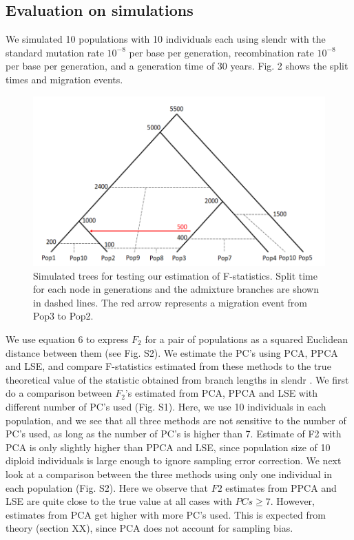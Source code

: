 \documentclass[12pt, letterpaper]{article}
\begin{document}
\subsection{Evaluation on simulations}
We simulated 10 populations with 10 individuals each using slendr \cite{petr_slendr_2022} with the standard mutation rate $10^{-8}$ per base per generation, recombination rate $10^{-8}$ per base per generation, and a generation time of 30 years. Fig. 2 shows the split times and migration events. 

\begin{figure}[ht!]
    \includegraphics[width=16.5cm]{inkscape/sim1.png}
    \centering
    \caption{Simulated trees for testing our estimation of F-statistics. Split time for each node in generations and the admixture branches are shown in dashed lines. The red arrow represents a migration event from Pop3 to Pop2.}
    \label{fig2:sim}
\end{figure}

We use equation 6 to express $F_2$ for a pair of populations as a squared Euclidean distance between them (see Fig. S2). We estimate the PC's using PCA, PPCA and LSE, and compare F-statistics estimated from these methods to the true theoretical value of the statistic obtained from branch lengths in slendr \cite{petr_slendr_2022}. We first do a comparison between $F_2$'s estimated from PCA, PPCA and LSE with different number of PC's used (Fig. S1). Here, we use 10 individuals in each population, and we see that all three methods are not sensitive to the number of PC's used, as long as the number of PC's is higher than 7. Estimate of F2 with PCA is only slightly higher than PPCA and LSE, since population size of 10 diploid individuals is large enough to ignore sampling error correction. We next look at a comparison between the three methods using only one individual in each population (Fig. S2). Here we observe that $F2$ estimates from PPCA and LSE are quite close to the true value at all cases with $PCs \geq 7$. However, estimates from PCA get higher with more PC's used. This is expected from theory (section XX), since PCA does not account for sampling bias.
\end{document}
